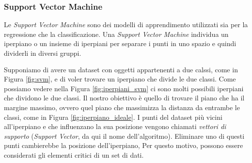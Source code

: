 \documentclass[a4paper,12pt]{report}
\begin{document}
\subsubsection{Support Vector Machine}
Le \textit{Support Vector Machine} sono dei modelli di apprendimento utilizzati sia per la regressione che la classificazione.
Una \textit{Support Vector Machine} \cite{SVM} individua un iperpiano o un insieme di iperpiani per separare i punti in uno spazio e quindi dividerli in diversi gruppi.

Supponiamo di avere un dataset con oggetti appartenenti a due calssi, come in Figura \ref{fig:svm}, e di voler trovare un iperpiano che divide le due classi. Come possiamo vedere nella Figura \ref{fig:iperpiani_svm} ci sono molti possibili iperpiani che dividono le due classi. Il nostro obiettivo è quello di trovare il piano che ha il margine massimo, ovvero quel piano che massimizza la distanza da entrambe le classi, come in Figura \ref{fig:iperpiano_ideale}. I punti del dataset più vicini all'iperpiano e che influenzano la sua posizione vengono chiamati \textit{vettori di supporto} (\textit{Support Vector}, da qui il nome dell'algoritmo). Eliminare uno di questi punti cambierebbe la posizione dell'iperpiano, Per questo motivo, possono essere considerati gli elementi critici di un set di dati.
\end{document}
